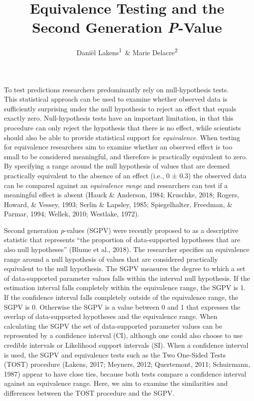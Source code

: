 \documentclass[floatsintext,man]{apa6}
\title{Equivalence Testing and the Second Generation \emph{P}-Value}
\author{Daniël Lakens\textsuperscript{1}~\& Marie Delacre\textsuperscript{2}}
\affiliation{
    \vspace{0.5cm}
          \textsuperscript{1} Eindhoven University of Technology, Eindhoven, The Netherlands\\
          \textsuperscript{2} Service of Analysis of the Data, Université Libre de Bruxelles, Belgium  }
\theoremstyle{definition}
\theoremstyle{definition}
\theoremstyle{definition}
\theoremstyle{remark}
\begin{document}
\maketitle

\setcounter{secnumdepth}{0}



To test predictions researchers predominantly rely on null-hypothesis
tests.\\
This statistical approach can be used to examine whether observed data
is sufficiently surprising under the null hypothesis to reject an effect
that equals exactly zero. Null-hypothesis tests have an important
limitation, in that this procedure can only reject the hypothesis that
there is no effect, while scientists should also be able to provide
statistical support for \emph{equivalence}. When testing for equivalence
researchers aim to examine whether an observed effect is too small to be
considered meaningful, and therefore is practically equivalent to zero.
By specifying a range around the null hypothesis of values that are
deemed practically equivalent to the absence of an effect (i.e., 0 ±
0.3) the observed data can be compared against an \emph{equivalence
range} and researchers can test if a meaningful effect is absent (Hauck
\& Anderson, 1984; Kruschke, 2018; Rogers, Howard, \& Vessey, 1993;
Serlin \& Lapsley, 1985; Spiegelhalter, Freedman, \& Parmar, 1994;
Wellek, 2010; Westlake, 1972).

Second generation \emph{p}-values (SGPV) were recently proposed to as a
descriptive statistic that represents \enquote{the proportion of
data-supported hypotheses that are also null hypotheses} (Blume et al.,
2018). The researcher specifies an equivalence range around a null
hypothesis of values that are considered practically equivalent to the
null hypothesis. The SGPV measures the degree to which a set of
data-supported parameter values falls within the interval null
hypothesis. If the estimation interval falls completely within the
equivalence range, the SGPV is 1. If the confidence interval falls
completely outside of the equivalence range, the SGPV is 0. Otherwise
the SGPV is a value between 0 and 1 that expresses the overlap of
data-supported hypotheses and the equivalence range. When calculating
the SGPV the set of data-supported parameter values can be represented
by a confidence interval (CI), although one could also choose to use
credible intervals or Likelihood support intervals (SI). When a
confidence interval is used, the SGPV and equivalence tests such as the
Two One-Sided Tests (TOST) procedure (Lakens, 2017; Meyners, 2012;
Quertemont, 2011; Schuirmann, 1987) appear to have close ties, because
both tests compare a confidence interval against an equivalence range.
Here, we aim to examine the similarities and differences between the
TOST procedure and the SGPV.
\end{document}
